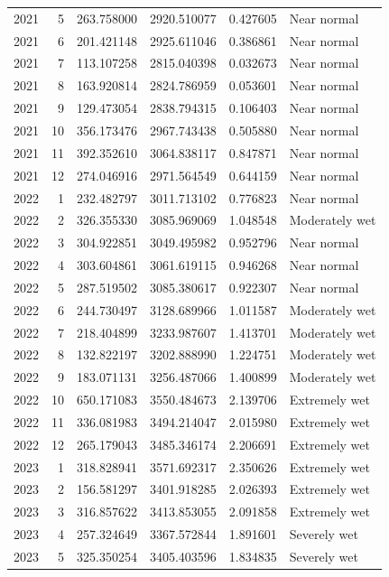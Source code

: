 \begin{tabular}{rrrrrl}
2021 & 5 & 263.758000 & 2920.510077 & 0.427605 & Near normal \\
2021 & 6 & 201.421148 & 2925.611046 & 0.386861 & Near normal \\
2021 & 7 & 113.107258 & 2815.040398 & 0.032673 & Near normal \\
2021 & 8 & 163.920814 & 2824.786959 & 0.053601 & Near normal \\
2021 & 9 & 129.473054 & 2838.794315 & 0.106403 & Near normal \\
2021 & 10 & 356.173476 & 2967.743438 & 0.505880 & Near normal \\
2021 & 11 & 392.352610 & 3064.838117 & 0.847871 & Near normal \\
2021 & 12 & 274.046916 & 2971.564549 & 0.644159 & Near normal \\
2022 & 1 & 232.482797 & 3011.713102 & 0.776823 & Near normal \\
2022 & 2 & 326.355330 & 3085.969069 & 1.048548 & Moderately wet \\
2022 & 3 & 304.922851 & 3049.495982 & 0.952796 & Near normal \\
2022 & 4 & 303.604861 & 3061.619115 & 0.946268 & Near normal \\
2022 & 5 & 287.519502 & 3085.380617 & 0.922307 & Near normal \\
2022 & 6 & 244.730497 & 3128.689966 & 1.011587 & Moderately wet \\
2022 & 7 & 218.404899 & 3233.987607 & 1.413701 & Moderately wet \\
2022 & 8 & 132.822197 & 3202.888990 & 1.224751 & Moderately wet \\
2022 & 9 & 183.071131 & 3256.487066 & 1.400899 & Moderately wet \\
2022 & 10 & 650.171083 & 3550.484673 & 2.139706 & Extremely wet \\
2022 & 11 & 336.081983 & 3494.214047 & 2.015980 & Extremely wet \\
2022 & 12 & 265.179043 & 3485.346174 & 2.206691 & Extremely wet \\
2023 & 1 & 318.828941 & 3571.692317 & 2.350626 & Extremely wet \\
2023 & 2 & 156.581297 & 3401.918285 & 2.026393 & Extremely wet \\
2023 & 3 & 316.857622 & 3413.853055 & 2.091858 & Extremely wet \\
2023 & 4 & 257.324649 & 3367.572844 & 1.891601 & Severely wet \\
2023 & 5 & 325.350254 & 3405.403596 & 1.834835 & Severely wet \\

\end{tabular}
